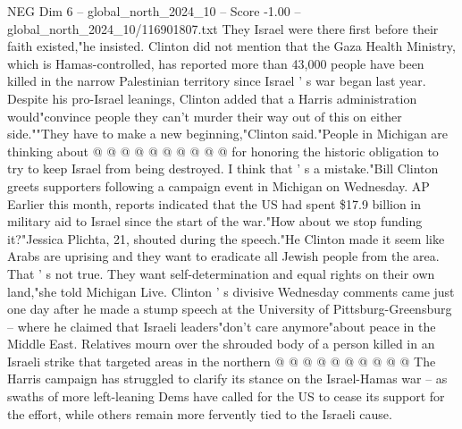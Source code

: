 \begin{textsample}{NEG Dim 6 – global\_north\_2024\_10 – Score -1.00 – global\_north\_2024\_10/116901807.txt}
They Israel were there first before their faith existed,"he insisted.
Clinton did not mention that the Gaza Health Ministry, which is Hamas-controlled, has reported more than 43,000 people have been killed in the narrow Palestinian territory since Israel ' s war began last year.
Despite his pro-Israel leanings, Clinton added that a Harris administration would"convince people they can't murder their way out of this on either side.""They have to make a new beginning,"Clinton said."People in Michigan are thinking about @ @ @ @ @ @ @ @ @ @ for honoring the historic obligation to try to keep Israel from being destroyed.
I think that ' s a mistake."Bill Clinton greets supporters following a campaign event in Michigan on Wednesday.
AP Earlier this month, reports indicated that the US had spent \$17.9 billion in military aid to Israel since the start of the war."How about we stop funding it?"Jessica Plichta, 21, shouted during the speech."He Clinton made it seem like Arabs are uprising and they want to eradicate all Jewish people from the area.
That ' s not true.
They want self-determination and equal rights on their own land,"she told Michigan Live.
Clinton ' s divisive Wednesday comments came just one day after he made a stump speech at the University of Pittsburg-Greensburg -- where he claimed that Israeli leaders"don't care anymore"about peace in the Middle East.
Relatives mourn over the shrouded body of a person killed in an Israeli strike that targeted areas in the northern @ @ @ @ @ @ @ @ @ @ The Harris campaign has struggled to clarify its stance on the Israel-Hamas war -- as swaths of more left-leaning Dems have called for the US to cease its support for the effort, while others remain more fervently tied to the Israeli cause.

\end{textsample}
